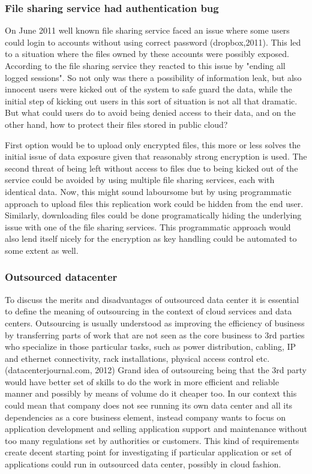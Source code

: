 \documentclass{article}
\begin{document}
\subsubsection{File sharing service had authentication bug}
On June 2011 well known file sharing service faced an issue where some users could login to accounts without using correct password (dropbox,2011). This led to a situation where the files owned by these accounts were possibly exposed. According to the file sharing service they reacted to this issue by "ending all logged sessions". So not only was there a possibility of information leak, but also innocent users were kicked out of the system to safe guard the data, while the initial step of kicking out users in this sort of situation is not all that dramatic. But what could users do to avoid being denied access to their data, and on the other hand, how to protect their files stored in public cloud?
\par
First option would be to upload only encrypted files, this more or less solves the initial issue of data exposure given that reasonably strong encryption is used. The second threat of being left without access to files due to being kicked out of the service could be avoided by using multiple file sharing services, each with identical data. Now, this might sound laboursome but by using programmatic approach to upload files this replication work could be hidden from the end user. Similarly, downloading files could be done programatically hiding the underlying issue with one of the file sharing services. This programmatic approach would also lend itself nicely for the encryption as key handling could be automated to some extent as well. 
\subsubsection{Outsourced datacenter}
To discuss the merits and disadvantages of outsourced data center it is essential to define the meaning of outsourcing in the context of cloud services and data centers. Outsourcing is usually understood as improving the efficiency of business by transferring parts of work that are not seen as the core business to 3rd parties who specialize in those particular tasks, such as power distribution, cabling, IP and ethernet connectivity, rack installations, physical access control etc. (datacenterjournal.com, 2012)
Grand idea of outsourcing being that the 3rd party would have better set of skills to do the work in more efficient and reliable manner and possibly by means of volume do it cheaper too. In our context this could mean that company does not see running its own data center and all its dependencies as a core business element, instead company wants to focus on application development and selling application support and maintenance without too many regulations set by authorities or customers. This kind of requirements create decent starting point for investigating if particular application or set of applications could run in outsourced data center, possibly in cloud fashion. 
\end{document}
